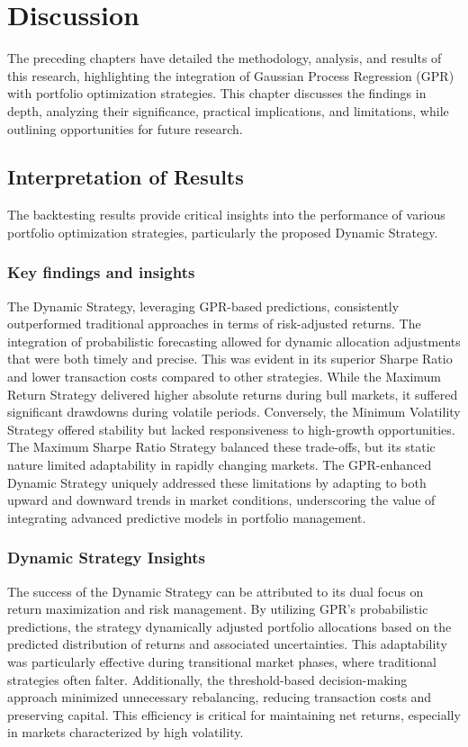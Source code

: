 
\chapter{Discussion}\label{chapter:discussion}
The preceding chapters have detailed the methodology, analysis, and results of this research, highlighting the integration of Gaussian Process Regression (GPR) with portfolio optimization strategies. 
This chapter discusses the findings in depth, analyzing their significance, practical implications, and limitations, while outlining opportunities for future research.
\section{Interpretation of Results}
The backtesting results provide critical insights into the performance of various portfolio optimization strategies, particularly the proposed Dynamic Strategy.

\subsection{Key findings and insights}
The Dynamic Strategy, leveraging \ac{GPR}-based predictions, consistently outperformed traditional approaches in terms of risk-adjusted returns. The integration of probabilistic forecasting allowed for dynamic allocation adjustments that were both timely and precise. This was evident in its superior Sharpe Ratio and lower transaction costs compared to other strategies.
While the Maximum Return Strategy delivered higher absolute returns during bull markets, it suffered significant drawdowns during volatile periods. Conversely, the Minimum Volatility Strategy offered stability but lacked responsiveness to high-growth opportunities. The Maximum Sharpe Ratio Strategy balanced these trade-offs, but its static nature limited adaptability in rapidly changing markets.
The \ac{GPR}-enhanced Dynamic Strategy uniquely addressed these limitations by adapting to both upward and downward trends in market conditions, underscoring the value of integrating advanced predictive models in portfolio management.

\subsection{Dynamic Strategy Insights}
The success of the Dynamic Strategy can be attributed to its dual focus on return maximization and risk management. By utilizing GPR’s probabilistic predictions, the strategy dynamically adjusted portfolio allocations based on the predicted distribution of returns and associated uncertainties. This adaptability was particularly effective during transitional market phases, where traditional strategies often falter.
Additionally, the threshold-based decision-making approach minimized unnecessary rebalancing, reducing transaction costs and preserving capital. This efficiency is critical for maintaining net returns, especially in markets characterized by high volatility.

